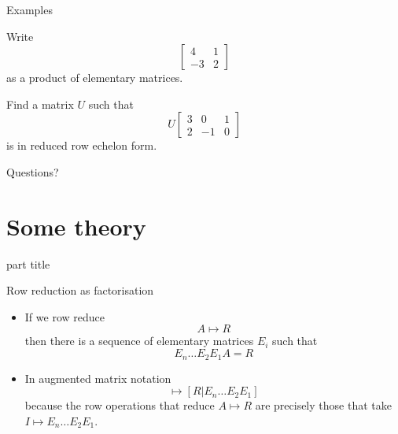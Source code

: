 \documentclass{beamer}
\begin{document}
\begin{frame}{Examples}
  \begin{example}
    Write
    \begin{equation*}
      \left[
	\begin{array}{cc}
          4&1\\
          -3&2
	\end{array}
      \right]
    \end{equation*}
    as a product of elementary matrices.
  \end{example}
  \begin{example}
    Find a matrix $U$ such that
    \begin{equation*}
      U
      \left[
	\begin{array}{ccc}
          3&0&1\\
          2&-1&0
	\end{array}
      \right]
    \end{equation*}
    is in reduced row echelon form.
  \end{example}
\end{frame}

\begin{frame}
  Questions?
\end{frame}

\section{Some theory}

\begin{frame}
  \begin{beamercolorbox}[sep=12pt,center]{part title}
    \insertsection\par
  \end{beamercolorbox}
\end{frame}

\begin{frame}{Row reduction as factorisation}
  \begin{itemize}
  \item If we row reduce
    \begin{equation*}
      A \mapsto R
    \end{equation*}
    then there is a sequence of elementary matrices $E_i$ such that
    \begin{equation*}
      E_n\dots E_2E_1A = R
    \end{equation*}
  \item In augmented matrix notation
  \begin{equation*}
    [A|I]\mapsto [R|E_n\dots E_2E_1]
  \end{equation*}
  because the row operations that reduce $A\mapsto R$ are precisely those that take $I\mapsto E_n\dots E_2E_1$.
  \end{itemize}
\end{frame}
\end{document}
